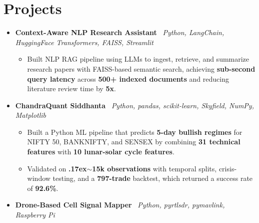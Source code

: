 \documentclass[letterpaper,11pt]{article}
\begin{document}
\section{Projects}
\begin{itemize}[leftmargin=0.15in, label={}, itemsep=-1pt, topsep=4pt]
  \item \noindent\textbf{Context-Aware NLP Research Assistant} \textbar\ {\small\textit{Python, LangChain, HuggingFace Transformers, FAISS, Streamlit}}\\
    \vspace{-3pt}
    \begin{itemize}[leftmargin=0.3in, label=\textbullet, itemsep=2pt, topsep=2pt]
      \item \small Built NLP RAG pipeline using LLMs to ingest, retrieve, and summarize research papers with FAISS-based semantic search, achieving \textbf{sub-second query latency} across \textbf{500+ indexed documents} and reducing literature review time by \textbf{5x}.
    \end{itemize}
  \item \noindent\textbf{ChandraQuant Siddhanta} \textbar\ {\small\textit{Python, pandas, scikit-learn, Skyfield, NumPy, Matplotlib}}\\
    \vspace{-3pt}
    \begin{itemize}[leftmargin=0.3in, label=\textbullet, itemsep=2pt, topsep=2pt]
      \item \small Built a Python ML pipeline that predicts \textbf{5-day bullish regimes} for NIFTY 50, BANKNIFTY, and SENSEX by combining \textbf{31 technical features} with \textbf{10 lunar-solar cycle features}.
      \item \small Validated on \textbf{{\raise.17ex\hbox{$\scriptstyle\sim$}}15k observations} with temporal splits, crisis-window testing, and a \textbf{797-trade} backtest, which returned a success rate of \textbf{92.6\%}.
    \end{itemize}
  \item \noindent\textbf{Drone-Based Cell Signal Mapper} \textbar\ {\small\textit{Python, pyrtlsdr, pymavlink, Raspberry Pi}}\\

\end{itemize}
\end{document}
